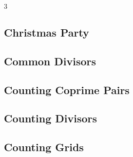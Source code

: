 \documentclass[8pt]{extarticle}
\begin{document}
\begin{multicols*}{3}
\subsection{Christmas Party}
\begin{caixaenunciado}

\end{caixaenunciado}
\vspace{0.3cm}


\subsection{Common Divisors}
\begin{caixaenunciado}

\end{caixaenunciado}
\vspace{0.3cm}


\subsection{Counting Coprime Pairs}
\begin{caixaenunciado}

\end{caixaenunciado}
\vspace{0.3cm}


\subsection{Counting Divisors}
\begin{caixaenunciado}

\end{caixaenunciado}
\vspace{0.3cm}


\subsection{Counting Grids}
\begin{caixaenunciado}

\end{caixaenunciado}
\vspace{0.3cm}



\end{multicols*}
\end{document}
